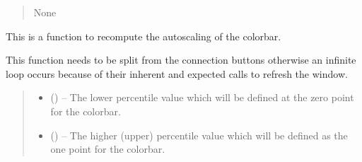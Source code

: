 \documentclass[letterpaper,11pt,english]{sphinxmanual}
\begin{document}
\begin{savenotes}
\begin{fulllineitems}
\begin{savenotes}
\begin{fulllineitems}
\begin{quote}
\begin{description}
\begin{itemize}
\end{itemize}

\sphinxAtStartPar
None

\end{description}\end{quote}

\end{fulllineitems}\end{savenotes}


\begin{savenotes}\begin{fulllineitems}
\label{\detokenize{code/opihiexarata.gui.selector:opihiexarata.gui.selector.TargetSelectorWindow._recompute_colorbar_autoscale}}
\pysigstartsignatures
{}
\pysigstopsignatures
\sphinxAtStartPar
This is a function to recompute the autoscaling of the colorbar.

\sphinxAtStartPar
This function needs to be split from the connection buttons otherwise
an infinite loop occurs because of their inherent and expected calls
to refresh the window.
\begin{quote}\begin{description}
\begin{itemize}
\item {} 
\sphinxAtStartPar
{} (\sphinxstyleliteralemphasis{\sphinxupquote{, }}) – The lower percentile value which will be defined at the zero point
for the colorbar.

\item {} 
\sphinxAtStartPar
{} (\sphinxstyleliteralemphasis{\sphinxupquote{, }}) – The higher (upper) percentile value which will be defined as the
one point for the colorbar.


\end{itemize}
\end{description}
\end{quote}
\end{fulllineitems}
\end{savenotes}
\end{fulllineitems}
\end{savenotes}
\end{document}
